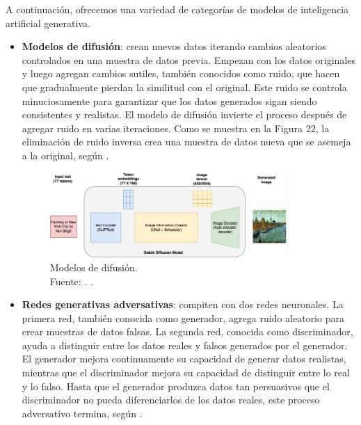 A continuación, ofrecemos una variedad de categorías de modelos de inteligencia artificial generativa.

\begin{itemize}
	\item \textbf{Modelos de difusión}: crean nuevos datos iterando cambios aleatorios controlados en una muestra de datos previa. Empezan con los datos originales y luego agregan cambios sutiles, también conocidos como ruido, que hacen que gradualmente pierdan la similitud con el original. Este ruido se controla minuciosamente para garantizar que los datos generados sigan siendo consistentes y realistas. El modelo de difusión invierte el proceso después de agregar ruido en varias iteraciones. Como se muestra en la Figura 22, la eliminación de ruido inversa crea una muestra de datos nueva que se asemeja a la original, según \parencite{tec_amaz2023iagen}.
	
	\begin{figure}[!ht]
		\begin{center}
			\includegraphics[width=0.85\textwidth]{2/figures/modelosdedifusion.jpg}
			\caption[Modelos de difusión]{Modelos de difusión.\\
			Fuente: \cite{tec_amaz2023iagen}. .}
			\label{2:fig8}
		\end{center}
	\end{figure}

	\item \textbf{Redes generativas adversativas}: compiten con dos redes neuronales. La primera red, también conocida como generador, agrega ruido aleatorio para crear muestras de datos falsas. La segunda red, conocida como discriminador, ayuda a distinguir entre los datos reales y falsos generados por el generador. El generador mejora continuamente su capacidad de generar datos realistas, mientras que el discriminador mejora su capacidad de distinguir entre lo real y lo falso. Hasta que el generador produzca datos tan persuasivos que el discriminador no pueda diferenciarlos de los datos reales, este proceso adversativo termina, según \parencite{tec_amaz2023iagen}.


\end{itemize}
